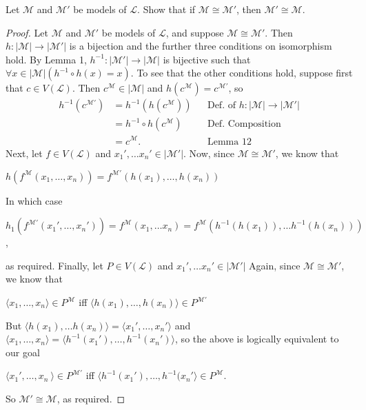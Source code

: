 \documentclass{article}
\begin{document}
\begin{proposition}
 Let $\mathcal{M}$ and $\mathcal{M'}$  be models of $\mathscr{L}$. Show that if $\mathcal{M} \cong \mathcal{M'}$, then $\mathcal{M'} \cong \mathcal{M}$. 
 \end{proposition}
\begin{proof}  Let $\mathcal{M}$ and $\mathcal{M'}$  be models of $\mathscr{L}$, and suppose $\mathcal{M} \cong \mathcal{M'}$. Then $h: | \mathcal{M} | \rightarrow | \mathcal{M'} |$
is a bijection and the further three conditions on isomorphism hold. By Lemma 1, $h^{-1}: |\mathcal{M'}| \rightarrow |\mathcal{M}|$ is bijective such that $\forall x\in |\mathcal{M}|(h^{-1} \circ h(x) = x)$. To see that the other conditions hold, suppose first that $c \in V(\mathscr{L})$. Then $c^\mathcal{M} \in |\mathcal{M}|$ and $h(c^\mathcal{M}) = c^\mathcal{M'}$, so
\begin{align*}
h^{-1}(c^\mathcal{M'}) &= h^{-1}(h(c^\mathcal{M}))&&\text{Def. of $h: | \mathcal{M} | \rightarrow | \mathcal{M'} |$}\\
&=h^{-1} \circ h(c^\mathcal{M})&&\text{Def. Composition}\\
&= c^\mathcal{M}.&&\text{Lemma 12}
\end{align*}
Next, let $f \in V(\mathscr{L})$ and $x_1', \ldots x_n' \in |\mathcal{M'}|$. Now, since $\mathcal{M} \cong \mathcal{M'}$, we know that \begin{center} $h(f^\mathcal{M}(x_1,\ldots,x_n)) = f^\mathcal{M'}(h(x_1),\ldots,h(x_n))$ \end{center} In which case \begin{center}$h_1(f^\mathcal{M'}(x_1',\ldots,x_n')) = f^\mathcal{M}(x_1,\ldots x_n) = f^\mathcal{M}(h^{-1}(h(x_1)), \ldots h^{-1}(h(x_n)))$, \end{center} as required. Finally, let $P \in V(\mathscr{L})$ and  $x_1', \ldots x_n' \in |\mathcal{M'}|$ Again, since $\mathcal{M} \cong \mathcal{M'}$, we know that \begin{center} $\langle x_1, \ldots, x_n \rangle \in P^\mathcal{M}$ iff $\langle h(x_1), \ldots, h(x_n) \rangle \in P^\mathcal{M'}$ \end{center} But $\langle h(x_1), \ldots h(x_n) \rangle  = \langle x_1', \ldots, x_n' \rangle$ and $\langle x_1, \ldots, x_n \rangle = \langle h^{-1}(x_1'), \ldots, h^{-1}(x_n') \rangle$, so the above is logically equivalent to our goal \begin{center} $\langle x_1', \ldots, x_n\ \rangle \in P^\mathcal{M'}$ iff  $\langle h^{-1}(x_1'), \ldots, h^{-1}(x_n' \rangle \in P^\mathcal{M}$. \end{center} So $\mathcal{M'} \cong \mathcal{M}$, as required.
\end{proof}
\end{document}
